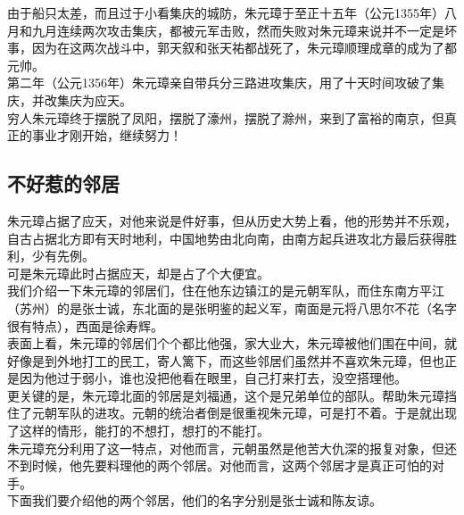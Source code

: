 \begin{multicols}{\theparacolNo}
由于船只太差，而且过于小看集庆的城防，朱元璋于至正十五年（公元1355年）八月和九月连续两次攻击集庆，都被元军击败，然而失败对朱元璋来说并不一定是坏事，因为在这两次战斗中，郭天叙和张天祐都战死了，朱元璋顺理成章的成为了都元帅。\\

第二年（公元1356年）朱元璋亲自带兵分三路进攻集庆，用了十天时间攻破了集庆，并改集庆为应天。\\

穷人朱元璋终于摆脱了凤阳，摆脱了濠州，摆脱了滁州，来到了富裕的南京，但真正的事业才刚开始，继续努力！\\

\subsection{不好惹的邻居}
朱元璋占据了应天，对他来说是件好事，但从历史大势上看，他的形势并不乐观，自古占据北方即有天时地利，中国地势由北向南，由南方起兵进攻北方最后获得胜利，少有先例。\\

可是朱元璋此时占据应天，却是占了个大便宜。\\

我们介绍一下朱元璋的邻居们，住在他东边镇江的是元朝军队，而住东南方平江（苏州）的是张士诚，东北面的是张明鉴的起义军，南面是元将八思尔不花（名字很有特点），西面是徐寿辉。\\

表面上看，朱元璋的邻居们个个都比他强，家大业大，朱元璋被他们围在中间，就好像是到外地打工的民工，寄人篱下，而这些邻居们虽然并不喜欢朱元璋，但也正是因为他过于弱小，谁也没把他看在眼里，自己打来打去，没空搭理他。\\

更关键的是，朱元璋北面的邻居是刘福通，这个是兄弟单位的部队。帮助朱元璋挡住了元朝军队的进攻。元朝的统治者倒是很重视朱元璋，可是打不着。于是就出现了这样的情形，能打的不想打，想打的不能打。\\

朱元璋充分利用了这一特点，对他而言，元朝虽然是他苦大仇深的报复对象，但还不到时候，他先要料理他的两个邻居。对他而言，这两个邻居才是真正可怕的对手。\\

下面我们要介绍他的两个邻居，他们的名字分别是张士诚和陈友谅。\\
\ifnum{}
	\end{multicols}
\fi
\newpage
